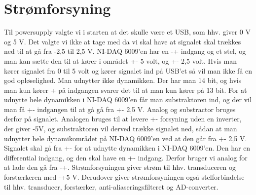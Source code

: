\section{Strømforsyning}
Til powersupply valgte vi i starten at det skulle være et USB, som hhv. giver 0 V og 5 V. Det valgte vi ikke at tage med da vi skal have at signalet skal trækkes ned til at gå fra -2,5 til 2,5 V. NI-DAQ 6009'en har en -+ indgang og et stel, og man kan sætte den til at kører i området +- 5 volt, og +- 2,5 volt. Hvis man kører signalet fra 0 til 5 volt og kører signalet ind på USB’et så vil man ikke få en god opløselighed. Man udnytter ikke dynamikken. Der har man 14 bit, og hvis man kun kører + på indgangen svarer det til at man kun kører på 13 bit. For at udnytte hele dynamikken i NI-DAQ 6009’en får man substraktoren ind, og der vil man få +- indgangen til at gå gå fra +- 2,5 V. Analog og substractor bruges derfor på signalet. Analogen bruges til at levere +- forsyning uden en inverter, der giver -5V, og substraktoren vil derved trække signalet ned, sådan at  man udnytter hele dynamikområdet på NI-DAQ 6009’en ved at den  går fra +- 2,5 V. Signalet skal gå fra +- for at udnytte dynamikken i NI-DAQ 6009’en. Den har en differential indgang, og den skal have en +- indgang. Derfor bruger vi analog for at lade den gå fra -+.
Strømforsyningen giver strøm til hhv. transduceren og forstærkeren med -+5 V.  Derudover giver strømforsyningen også stelforbindelse til hhv. transducer, forstærker, anti-aliaseringsfilteret og AD-converter. 